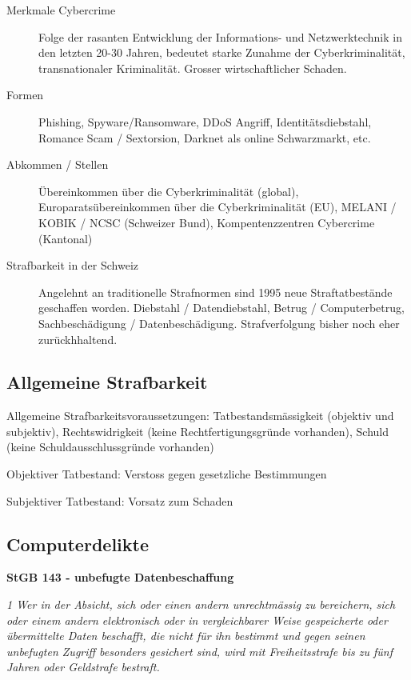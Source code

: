 \begin{description}
  \item[Merkmale Cybercrime] Folge der rasanten Entwicklung der Informations- und Netzwerktechnik in den letzten 20-30 Jahren, bedeutet starke Zunahme der Cyberkriminalität, transnationaler Kriminalität. Grosser wirtschaftlicher Schaden.
  \item[Formen] Phishing, Spyware/Ransomware, DDoS Angriff, Identitätsdiebstahl, Romance Scam / Sextorsion, Darknet als online Schwarzmarkt, etc.
  \item[Abkommen / Stellen] Übereinkommen über die Cyberkriminalität (global), Europaratsübereinkommen über die Cyberkriminalität (EU), MELANI / KOBIK / NCSC (Schweizer Bund), Kompentenzzentren Cybercrime (Kantonal)
  \item[Strafbarkeit in der Schweiz] Angelehnt an traditionelle Strafnormen sind 1995 neue Straftatbestände geschaffen worden. Diebstahl / Datendiebstahl, Betrug / Computerbetrug,  Sachbeschädigung / Datenbeschädigung. Strafverfolgung bisher noch eher zurückhhaltend.
\end{description}

\subsection{Allgemeine Strafbarkeit}

Allgemeine Strafbarkeitsvoraussetzungen: Tatbestandsmässigkeit (objektiv und subjektiv), Rechtswidrigkeit (keine Rechtfertigungsgründe vorhanden), Schuld (keine Schuldausschlussgründe vorhanden)

Objektiver Tatbestand: Verstoss gegen gesetzliche Bestimmungen

Subjektiver Tatbestand: Vorsatz zum Schaden
\vspace{3mm}

\subsection{Computerdelikte}

\textbf{StGB 143 - unbefugte Datenbeschaffung}

\textit{1 Wer in der Absicht, sich oder einen andern unrechtmässig zu bereichern, sich oder einem andern elektronisch oder in vergleichbarer Weise gespeicherte oder übermittelte Daten beschafft, die nicht für ihn bestimmt und gegen seinen unbefugten Zugriff besonders gesichert sind, wird mit Freiheitsstrafe bis zu fünf Jahren oder Geldstrafe bestraft.}

